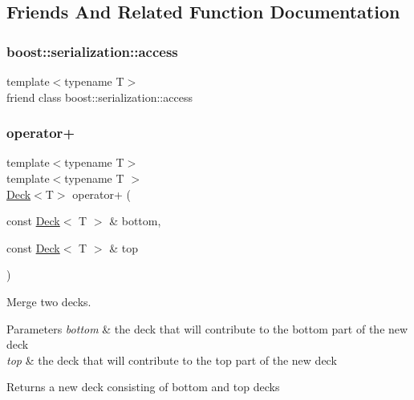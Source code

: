 \subsection{Friends And Related Function Documentation}
\mbox{\label{classpan_1_1detail_1_1_deck_ac98d07dd8f7b70e16ccb9a01abf56b9c}} 
\subsubsection{\texorpdfstring{boost\+::serialization\+::access}{boost::serialization::access}}
{\footnotesize\ttfamily template$<$typename T$>$ \\
friend class boost\+::serialization\+::access\hspace{0.3cm}{\ttfamily [friend]}}

\mbox{\label{classpan_1_1detail_1_1_deck_a6a019fd327e92f2f97cb25e9efdf95e2}} 
\subsubsection{\texorpdfstring{operator+}{operator+}}
{\footnotesize\ttfamily template$<$typename T$>$ \\
template$<$typename T $>$ \\
\hyperlink{classpan_1_1detail_1_1_deck}{Deck}$<$T$>$ operator+ (\begin{DoxyParamCaption}\item[{const \hyperlink{classpan_1_1detail_1_1_deck}{Deck}$<$ T $>$ \&}]{bottom,  }\item[{const \hyperlink{classpan_1_1detail_1_1_deck}{Deck}$<$ T $>$ \&}]{top }\end{DoxyParamCaption})\hspace{0.3cm}{\ttfamily [friend]}}

Merge two decks. 
\begin{DoxyParams}{Parameters}
{\em bottom} & the deck that will contribute to the bottom part of the new deck \\
\hline
{\em top} & the deck that will contribute to the top part of the new deck \\
\hline
\end{DoxyParams}
\begin{DoxyReturn}{Returns}
a new deck consisting of bottom and top decks 
\end{DoxyReturn}
\mbox{\label{classpan_1_1detail_1_1_deck_ab8b4a9b9c08e387099a284faf9b15281}} 
